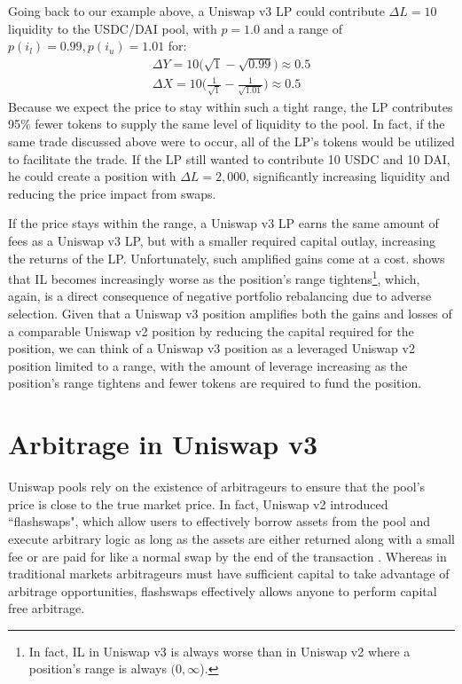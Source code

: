\documentclass[11pt]{article}
\begin{document}
Going back to our example above, a Uniswap v3 LP could contribute $\Delta L = 10$ liquidity to the USDC/DAI pool, with $p = 1.0$ and a range of $p(i_l) = 0.99, p(i_u) = 1.01$ for:
\begin{gather*}
    \Delta Y = 10 \big( \sqrt{1} - \sqrt{0.99} \big) \approx 0.5 \\
    \Delta X = 10 \bigg( \frac{1}{\sqrt{1}} - \frac{1}{\sqrt{1.01}} \bigg) \approx 0.5
\end{gather*}
Because we expect the price to stay within such a tight range, the LP contributes 95\% fewer tokens to supply the same level of liquidity to the pool. In fact, if the same trade discussed above were to occur, all of the LP's tokens would be utilized to facilitate the trade. If the LP still wanted to contribute 10 USDC and 10 DAI, he could create a position with $\Delta L = 2,000$, significantly increasing liquidity and reducing the price impact from swaps.

If the price stays within the range, a Uniswap v3 LP earns the same amount of fees as a Uniswap v3 LP, but with a smaller required capital outlay, increasing the returns of the LP. Unfortunately, such amplified gains come at a cost. \citet{LambertMedium3} shows that IL becomes increasingly worse as the position's range tightens\footnote{In fact, IL in Uniswap v3 is always worse than in Uniswap v2 where a position's range is always $(0, \infty$).}, which, again, is a direct consequence of negative portfolio rebalancing due to adverse selection. Given that a Uniswap v3 position amplifies both the gains and losses of a comparable Uniswap v2 position by reducing the capital required for the position, we can think of a Uniswap v3 position as a leveraged Uniswap v2 position limited to a range, with the amount of leverage increasing as the position's range tightens and fewer tokens are required to fund the position.

\section{Arbitrage in Uniswap v3}\label{sec:3}

Uniswap pools rely on the existence of arbitrageurs to ensure that the pool's price is close to the true market price. In fact, Uniswap v2 introduced ``\glspl{flashswap}", which allow users to effectively borrow assets from the pool and execute arbitrary logic as long as the assets are either returned along with a small fee or are paid for like a normal swap by the end of the transaction \citep{Uniswapv2}. Whereas in traditional markets arbitrageurs must have sufficient capital to take advantage of arbitrage opportunities, \glspl{flashswap} effectively allows anyone to perform capital free arbitrage.
\end{document}
